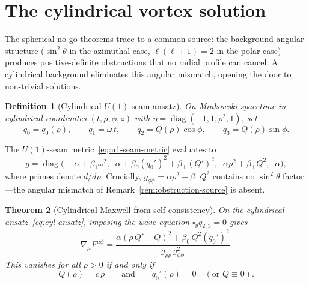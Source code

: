 \documentclass[pdflatex,sn-mathphys-num]{sn-jnl}
\theoremstyle{thmstyleone}%
\newtheorem{theorem}{Theorem}[section]
\theoremstyle{thmstyletwo}%
\theoremstyle{thmstylethree}%
\newtheorem{definition}[theorem]{Definition}
\newcommand{\nn}{\nabla}
\numberwithin{equation}{section}
\begin{document}
\section{The cylindrical vortex solution}
\label{sec:cyl}

The spherical no-go theorems trace to a common source: the
background angular structure ($\sin^2\!\theta$ in the azimuthal
case, $\ell(\ell+1)=2$ in the polar case) produces positive-definite
obstructions that no radial profile can cancel.  A cylindrical
background eliminates this angular mismatch, opening the door to
non-trivial solutions.

\begin{definition}[Cylindrical $U(1)$-seam ansatz]
\label{def:cylindrical-ansatz}
On Minkowski spacetime in cylindrical coordinates
$(t,\rho,\phi,z)$ with $\eta = \operatorname{diag}(-1,1,\rho^2,1)$,
set
\begin{equation}
\label{eq:cyl-ansatz}
q_0 = q_0(\rho), \qquad q_1 = \omega\,t, \qquad
q_2 = Q(\rho)\cos\phi, \qquad q_3 = Q(\rho)\sin\phi.
\end{equation}
\end{definition}

The $U(1)$-seam metric~\eqref{eq:u1-seam-metric} evaluates to
\begin{equation}
\label{eq:cyl-metric}
g = \operatorname{diag}\!\bigl(
  -\alpha+\beta_1\omega^2,\;\;
  \alpha+\beta_0(q_0')^2+\beta_\perp(Q')^2,\;\;
  \alpha\rho^2+\beta_\perp Q^2,\;\;
  \alpha
\bigr),
\end{equation}
where primes denote $d/d\rho$.  Crucially, $g_{\phi\phi}
= \alpha\rho^2 + \beta_\perp Q^2$ contains no $\sin^2\!\theta$
factor---the angular mismatch of
Remark~\ref{rem:obstruction-source} is absent.

\begin{theorem}[Cylindrical Maxwell from self-consistency]
\label{thm:cyl-maxwell}
On the cylindrical ansatz~\eqref{eq:cyl-ansatz}, imposing the wave
equation $\square_g q_{2,3} = 0$ gives
\begin{equation}
\label{eq:cyl-numerator}
\nn_\mu F^{\mu\phi}
= \frac{\alpha(\rho\,Q' - Q)^2
        + \beta_0\,Q^2(q_0')^2}
       {g_{\rho\rho}\,g_{\phi\phi}^2}.
\end{equation}
This vanishes for all $\rho > 0$ if and only if
\begin{equation}
\label{eq:cyl-maxwell-conditions}
Q(\rho) = c\,\rho
\qquad\text{and}\qquad
q_0'(\rho) = 0
\quad(\text{or } Q \equiv 0).
\end{equation}
\end{theorem}
\end{document}
